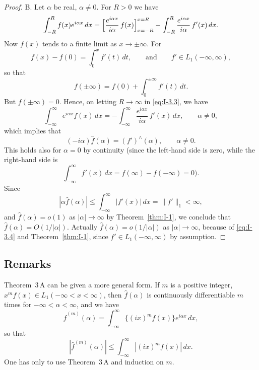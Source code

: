 \begin{proof}
\textup{B.} Let $\alpha$ be real, $\alpha\neq 0$. For $R>0$ we have
\begin{equation}\label{eq:I-3.3}
\int_{-R}^{R}f(x)e^{i\alpha x}\,dx
=\Bigl[\frac{e^{i\alpha x}}{i\alpha}\,f(x)\Bigr]_{x=-R}^{x=R}
-\int_{-R}^{R}\frac{e^{i\alpha x}}{i\alpha}\,f'(x)\,dx.
\end{equation}
Now $f(x)$ tends to a finite limit as $x\to\pm\infty$. For
\begin{equation*}
f(x)-f(0)=\int_0^x f'(t)\,dt,
\qquad\text{and}\qquad f'\in L_1(-\infty,\infty),
\end{equation*}
so that
\begin{equation*}
f(\pm\infty)=f(0)+\int_0^{\pm\infty}f'(t)\,dt.
\end{equation*}
But $f(\pm\infty)=0$. Hence, on letting $R\to\infty$ in \eqref{eq:I-3.3}, we have
\begin{equation*}
\int_{-\infty}^{\infty}e^{i\alpha x}f(x)\,dx
=-\int_{-\infty}^{\infty}\frac{e^{i\alpha x}}{i\alpha}\,f'(x)\,dx,
\qquad\alpha\neq 0,
\end{equation*}
which implies that
\begin{equation}\label{eq:I-3.4}
(-i\alpha)\widehat f(\alpha)=(f')^{\wedge}(\alpha),\qquad\alpha\neq 0.
\end{equation}
This holds also for $\alpha=0$ by continuity (since the left-hand side is zero, while the right-hand side is
\begin{equation*}
\int_{-\infty}^{\infty}f'(x)\,dx=f(\infty)-f(-\infty)=0).
\end{equation*}
Since
\begin{equation*}
|\alpha\widehat f(\alpha)|\le\int_{-\infty}^{\infty}|f'(x)|\,dx=\|f'\|_1<\infty,
\end{equation*}
and $\hat f(\alpha)=o(1)$ as $|\alpha|\to\infty$ by Theorem~\ref{thm:I-1}, we conclude that $\hat f(\alpha)=O(1/|\alpha|)$. Actually $\hat f(\alpha)=o(1/|\alpha|)$ as $|\alpha|\to\infty$, because of \eqref{eq:I-3.4} and Theorem~\ref{thm:I-1}, since $f'\in L_1(-\infty,\infty)$ by assumption.
\end{proof}

\subsection*{Remarks}
Theorem~3\,A can be given a more general form. If $m$ is a positive integer, $x^m f(x)\in L_1(-\infty<x<\infty)$, then $\hat f(\alpha)$ is continuously differentiable $m$ times for $-\infty<\alpha<\infty$, and we have
\begin{equation}\label{eq:I-3.mA}
\hat f^{(m)}(\alpha)=\int_{-\infty}^{\infty}\{(ix)^m f(x)\}e^{i\alpha x}\,dx,
\end{equation}
so that
\begin{equation*}
|\hat f^{(m)}(\alpha)|\le\int_{-\infty}^{\infty}|(ix)^m f(x)|\,dx.
\end{equation*}
One has only to use Theorem~3\,A and induction on $m$.

